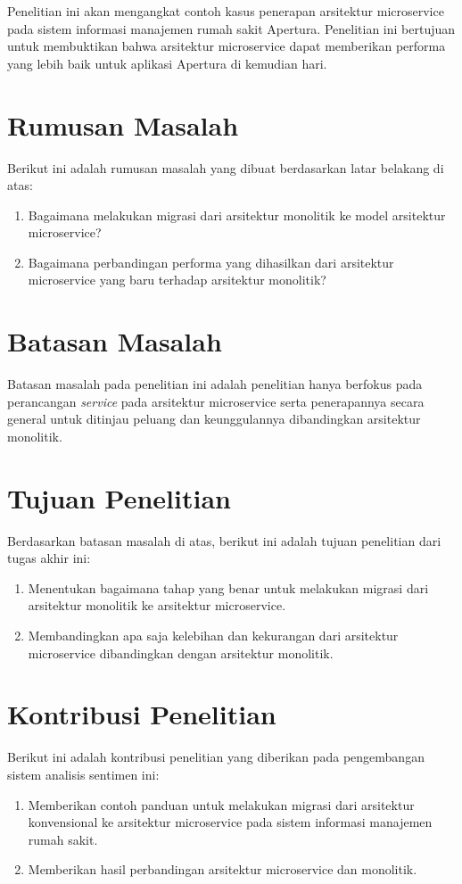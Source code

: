 Penelitian ini akan mengangkat contoh kasus penerapan arsitektur microservice pada sistem informasi manajemen rumah sakit Apertura. Penelitian ini bertujuan untuk membuktikan bahwa arsitektur microservice dapat memberikan performa yang lebih baik untuk aplikasi Apertura di kemudian hari.
\section{Rumusan Masalah}
Berikut ini adalah rumusan masalah yang dibuat berdasarkan latar belakang di atas:
\begin {enumerate}[nolistsep, leftmargin=0.5cm]
\item Bagaimana melakukan migrasi dari arsitektur monolitik ke model arsitektur microservice?
\item Bagaimana perbandingan performa yang dihasilkan dari arsitektur microservice yang baru terhadap arsitektur monolitik?
\end{enumerate}

\section{Batasan Masalah}
Batasan masalah pada penelitian ini adalah penelitian hanya berfokus pada perancangan \textit{service} pada arsitektur microservice serta penerapannya secara general untuk ditinjau peluang dan keunggulannya dibandingkan arsitektur monolitik.

\section{Tujuan Penelitian}
Berdasarkan batasan masalah di atas, berikut ini adalah tujuan penelitian dari tugas akhir ini:
\begin{enumerate}[nolistsep,leftmargin=0.5cm]
\item Menentukan bagaimana tahap yang benar untuk melakukan migrasi dari arsitektur monolitik ke arsitektur microservice.
\item Membandingkan apa saja kelebihan dan kekurangan dari arsitektur microservice dibandingkan dengan arsitektur monolitik.
\end{enumerate}

\section{Kontribusi Penelitian}
Berikut ini adalah kontribusi penelitian yang diberikan pada pengembangan sistem analisis sentimen ini:
\begin{enumerate}[nolistsep,leftmargin=0.5cm]
\item Memberikan contoh panduan untuk melakukan migrasi dari arsitektur konvensional ke arsitektur microservice pada sistem informasi manajemen rumah sakit.
\item Memberikan hasil perbandingan arsitektur microservice dan monolitik.
\end{enumerate}

